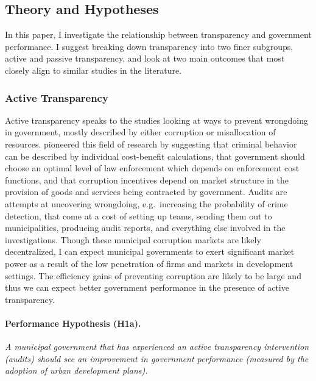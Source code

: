 \documentclass[11pt]{article}
\begin{document}
\subsection{Theory and Hypotheses} \label{subsec:theory_paper3}

In this paper, I investigate the relationship between transparency and government performance. I suggest breaking down transparency into two finer subgroups, active and passive transparency, and look at two main outcomes that most closely align to similar studies in the literature.

\subsubsection{Active Transparency} \label{subsubsec:theory1_paper3}

Active transparency speaks to the studies looking at ways to prevent wrongdoing in government, mostly described by either corruption or misallocation of resources. \citet{BeckerCrimePunishmentEconomic1968,BeckerLawEnforcementMalfeasance1974,Rose-AckermanEconomicsCorruption1975} pioneered this field of research by suggesting that criminal behavior can be described by individual cost-benefit calculations, that government should choose an optimal level of law enforcement which depends on enforcement cost functions, and that corruption incentives depend on market structure in the provision of goods and services being contracted by government. Audits are attempts at uncovering wrongdoing, e.g.~increasing the probability of crime detection, that come at a cost of setting up teams, sending them out to municipalities, producing audit reports, and everything else involved in the investigations. Though these municipal corruption markets are likely decentralized, I can expect municipal governments to exert significant market power as a result of the low penetration of firms and markets in development settings. The efficiency gains of preventing corruption are likely to be large and thus we can expect better government performance in the presence of active transparency.

\paragraph{Performance Hypothesis (H1a).} \emph{A municipal government that has experienced an active transparency intervention (audits) should see an improvement in government performance (measured by the adoption of urban development plans).}\\
\end{document}
